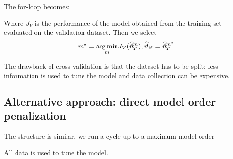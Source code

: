 The for-loop becomes:


Where $ J_{V}$ is the performance of the model obtained from the training set evaluated on the validation dataset. Then we select
\begin{equation*}
m^{\star} =\underset{m}{\operatorname*{arg\,min}} J_{V}(\widehat{\vartheta }_{T}^{m}) ,\widehat{\vartheta }_{N} =\widehat{\vartheta }_{T}^{m^{\star}}
\end{equation*}

The drawback of cross-validation is that the dataset has to be split: less information is used to tune the model and data collection can be expensive.


\subsection{Alternative approach: direct model order penalization}
The structure is similar, we run a cycle up to a maximum model order


All data is used to tune the model.

